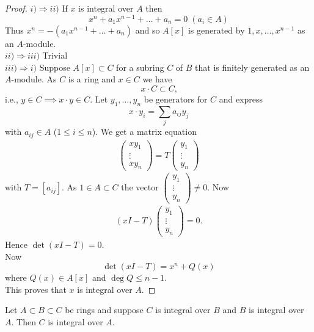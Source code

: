 \documentclass[NumTh.tex]{subfiles}
\begin{document}
\begin{proof}
  $i) \Rightarrow ii)$  If $x$ is integral over $A$ then
  \[ x^n + a_1 x^{n-1} + \dots + a_n = 0 \; (a_i \in A) \]
  Thus $x^n = - (a_1x^{n-1} + \dots + a_n)$ and so $A[x]$ is generated by $1,x,\dots,x^{n-1}$ as an $A$-module. \\
  $ii) \Rightarrow iii)$ Trivial \\
  $iii) \Rightarrow i)$ Suppose $A[x] \subset C$ for a subring $C$ of $B$ that is finitely generated as an $A$-module.
  As $C$ is a ring and $x \in C$ we have
  \[ x \cdot C \subset C \text{,} \] 
  i.e., $y \in C \implies x \cdot y \in C$.
  Let $y_1,\dots,y_n$ be generators for $C$ and express 
  \[ x \cdot y_i = \sum_{j} a_{ij}y_j \]
  with $a_{ij} \in A$ ($1 \leq i \leq n$).
  We get a matrix equation 
  \begin{align*}
    \begin{pmatrix}
      xy_1 \\
      \vdots \\
      xy_n
    \end{pmatrix}
    = T
    \begin{pmatrix}
      y_1 \\
      \vdots \\
      y_n
    \end{pmatrix}
  \end{align*}
  with $T = [a_{ij}]$.
  As $1 \in A \subset C$ the vector $
  \begin{pmatrix}
    y_1 \\
    \vdots \\
    y_n
  \end{pmatrix}
  \neq 0$.
  Now
  \begin{align*}
    (xI - T) 
    \begin{pmatrix}
      y_1 \\
      \vdots \\
      y_n
    \end{pmatrix}
    = 0 \text{.}
  \end{align*}
  Hence $\det(xI -T) = 0$.\\
  Now 
  \[ \det(xI - T) = x^n + Q(x) \]
  where $Q(x) \in A[x]$ and $\deg Q \leq n-1$.\\
  
  This proves that $x$ is integral over $A$.
\end{proof}

\begin{cor}\label{cor_3_3_3}
  Let $A \subset B \subset C$ be rings and suppose $C$ is integral over $B$ and $B$ is integral over $A$.
  Then $C$ is  integral over $A$.
\end{cor}
\end{document}
